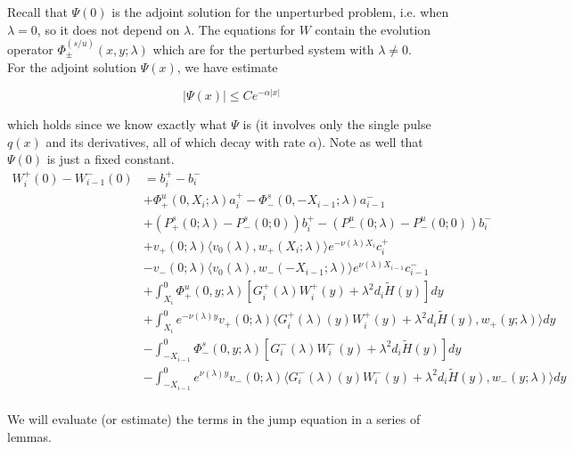 \documentclass[12pt]{article}
\begin{document}
Recall that $\Psi(0)$ is the adjoint solution for the unperturbed problem, i.e. when $\lambda = 0$, so it does not depend on $\lambda$. The equations for $W$ contain the evolution operator $\Phi^{(s/u)}_\pm(x, y; \lambda)$ which are for the perturbed system with $\lambda \neq 0$.\\

For the adjoint solution $\Psi(x)$, we have estimate 

\begin{equation}
|\Psi(x)| \leq C e^{-\alpha|x|}
\end{equation}

which holds since we know exactly what $\Psi$ is (it involves only the single pulse $q(x)$ and its derivatives, all of which decay with rate $\alpha$). Note as well that $\Psi(0)$ is just a fixed constant.\\

\begin{align*}
W_i^+(0) - W_{i-1}^-(0) &= b_i^+ - b_i^- \\
&+ \Phi^u_+(0, X_i; \lambda)a_i^+ - \Phi^s_-(0, -X_{i-1}; \lambda)a_{i-1}^- \\
&+(P^s_+(0; \lambda) - P^s_-(0; 0))b_i^+  - (P^u_-(0; \lambda) - P^u_-(0; 0))b_i^- \\
&+ v_+(0; \lambda) \langle v_0(\lambda), w_+(X_i; \lambda) \rangle e^{-\nu(\lambda)X_i} c_i^+ \\
&- v_-(0; \lambda) \langle v_0(\lambda), w_-(-X_{i-1}; \lambda) \rangle e^{\nu(\lambda)X_{i-1}} c_{i-1}^- \\
&+ \int_{X_i}^0 \Phi^u_+(0, y; \lambda) [ G_i^+(\lambda)W_i^+(y) + \lambda^2 d_i \tilde{H}(y) ] dy \\
&+ \int_{X_i}^0 e^{-\nu(\lambda)y} v_+(0; \lambda) \langle G_i^+(\lambda)(y)W_i^+(y) + \lambda^2 d_i \tilde{H}(y), w_+(y; \lambda) \rangle dy \\
&- \int_{-X_{i-1}}^0 \Phi^s_-(0, y; \lambda) [ G_i^-(\lambda)W_i^-(y) + \lambda^2 d_i \tilde{H}(y) ] dy \\
&- \int_{-X_{i-1}}^0
e^{\nu(\lambda)y} v_-(0; \lambda) \langle G_i^-(\lambda)(y)W_i^-(y) + \lambda^2 d_i \tilde{H}(y), w_-(y; \lambda) \rangle dy \\
\end{align*}

We will evaluate (or estimate) the terms in the jump equation in a series of lemmas.

\end{document}
